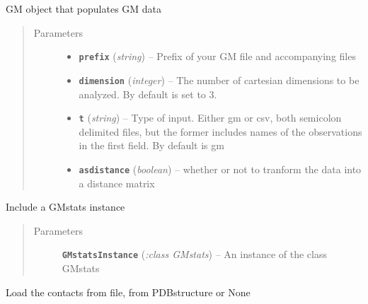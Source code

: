 \documentclass[letterpaper,10pt,english]{sphinxmanual}
\begin{document}
\begin{fulllineitems}
\label{Doc:Moduler.GMdata}
GM object that populates GM data
\begin{quote}\begin{description}
\item[{Parameters}] \leavevmode\begin{itemize}
\item {} 
\textbf{\texttt{prefix}} (\emph{string}) -- Prefix of your GM file and accompanying files

\item {} 
\textbf{\texttt{dimension}} (\emph{integer}) -- The number of cartesian dimensions to be analyzed. By default is set to 3.

\item {} 
\textbf{\texttt{t}} (\emph{string}) -- Type of input. Either gm or csv, both semicolon delimited files, but the former includes names of the observations in the first field. By default is gm

\item {} 
\textbf{\texttt{asdistance}} (\emph{boolean}) -- whether or not to tranform the data into a distance matrix

\end{itemize}

\end{description}\end{quote}

\begin{fulllineitems}
\label{Doc:Moduler.GMdata.Correlated}
Include a GMstats instance
\begin{quote}\begin{description}
\item[{Parameters}] \leavevmode
\textbf{\texttt{GMstatsInstance}} (\emph{:class GMstats}) -- An instance of the class GMstats

\end{description}\end{quote}

\end{fulllineitems}


\begin{fulllineitems}
\label{Doc:Moduler.GMdata.Load_contacts}
Load the contacts from file, from PDBstructure or None


\end{fulllineitems}
\end{fulllineitems}
\end{document}
